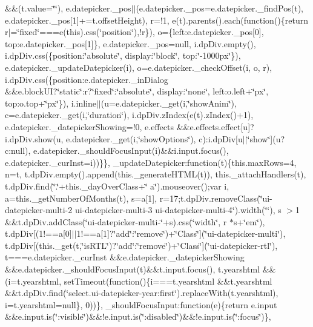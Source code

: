 {{\begin{DoxyParamCaption}
\&\&(t.\+value=\char`\"{}\char`\"{}), e.\+datepicker.\+\_\+pos$\vert$$\vert$(e.\+datepicker.\+\_\+pos=e.\+datepicker.\+\_\+find\+Pos(t), e.\+datepicker.\+\_\+pos\mbox{[}1\mbox{]}+=t.\+offset\+Height), r=!1, e(t).\+parents().\+each(function()\{return r$\vert$=\char`\"{}fixed\char`\"{}===e(this).\+css(\char`\"{}position\char`\"{}),!r\}), o=\{left\+:e.\+datepicker.\+\_\+pos\mbox{[}0\mbox{]}, top\+:e.\+datepicker.\+\_\+pos\mbox{[}1\mbox{]}\}, e.\+datepicker.\+\_\+pos=null, i.\+dp\+Div.\+empty(), i.\+dp\+Div.\+css(\{position\+:\char`\"{}absolute\char`\"{}, display\+:\char`\"{}block\char`\"{}, top\+:\char`\"{}-\/1000px\char`\"{}\}), e.\+datepicker.\+\_\+update\+Datepicker(i), o=e.\+datepicker.\+\_\+check\+Offset(i, o, r), i.\+dp\+Div.\+css(\{position\+:e.\+datepicker.\+\_\+in\+Dialog \&\&e.\+block\+U\+I?\char`\"{}static\char`\"{}\+:r?\char`\"{}fixed\char`\"{}\+:\char`\"{}absolute\char`\"{}, display\+:\char`\"{}none\char`\"{}, left\+:o.\+left+\char`\"{}px\char`\"{}, top\+:o.\+top+\char`\"{}px\char`\"{}\}), i.\+inline$\vert$$\vert$(u=e.\+datepicker.\+\_\+get(i,\char`\"{}show\+Anim\char`\"{}), c=e.\+datepicker.\+\_\+get(i,\char`\"{}duration\char`\"{}), i.\+dp\+Div.\+z\+Index(e(t).\+z\+Index()+1), e.\+datepicker.\+\_\+datepicker\+Showing=!0, e.\+effects \&\&e.\+effects.\+effect\mbox{[}u\mbox{]}?i.\+dp\+Div.\+show(u, e.\+datepicker.\+\_\+get(i,\char`\"{}show\+Options\char`\"{}), c)\+:i.\+dp\+Div\mbox{[}u$\vert$$\vert$\char`\"{}show\char`\"{}\mbox{]}(u?c\+:null), e.\+datepicker.\+\_\+should\+Focus\+Input(i)\&\&i.\+input.\+focus(), e.\+datepicker.\+\_\+cur\+Inst=i))\}\}, \+\_\+update\+Datepicker\+:function(t)\{this.\+max\+Rows=4, n=t, t.\+dp\+Div.\+empty().\+append(this.\+\_\+generate\+H\+T\+M\+L(t)), this.\+\_\+attach\+Handlers(t), t.\+dp\+Div.\+find(\char`\"{}.\char`\"{}+this.\+\_\+day\+Over\+Class+\char`\"{} a\char`\"{}).\+mouseover();var i, a=this.\+\_\+get\+Number\+Of\+Months(t), s=a\mbox{[}1\mbox{]}, r=17;t.\+dp\+Div.\+remove\+Class(\char`\"{}ui-\/datepicker-\/multi-\/2 ui-\/datepicker-\/multi-\/3 ui-\/datepicker-\/multi-\/4\char`\"{}).\+width(\char`\"{}\char`\"{}), s $>$1 \&\&t.\+dp\+Div.\+add\+Class(\char`\"{}ui-\/datepicker-\/multi-\/\char`\"{}+s).\+css(\char`\"{}width\char`\"{}, r $\ast$s+\char`\"{}em\char`\"{}), t.\+dp\+Div\mbox{[}(1!==a\mbox{[}0\mbox{]}$\vert$$\vert$1!==a\mbox{[}1\mbox{]}?\char`\"{}add\char`\"{}\+:\char`\"{}remove\char`\"{})+\char`\"{}\+Class\char`\"{}\mbox{]}(\char`\"{}ui-\/datepicker-\/multi\char`\"{}), t.\+dp\+Div\mbox{[}(this.\+\_\+get(t,\char`\"{}is\+R\+T\+L\char`\"{})?\char`\"{}add\char`\"{}\+:\char`\"{}remove\char`\"{})+\char`\"{}\+Class\char`\"{}\mbox{]}(\char`\"{}ui-\/datepicker-\/rtl\char`\"{}), t===e.\+datepicker.\+\_\+cur\+Inst \&\&e.\+datepicker.\+\_\+datepicker\+Showing \&\&e.\+datepicker.\+\_\+should\+Focus\+Input(t)\&\&t.\+input.\+focus(), t.\+yearshtml \&\&(i=t.\+yearshtml, set\+Timeout(function()\{i===t.\+yearshtml \&\&t.\+yearshtml \&\&t.\+dp\+Div.\+find(\char`\"{}select.\+ui-\/datepicker-\/year\+:first\char`\"{}).\+replace\+With(t.\+yearshtml), i=t.\+yearshtml=null\}, 0))\}, \+\_\+should\+Focus\+Input\+:function(e)\{return e.\+input \&\&e.\+input.\+is(\char`\"{}\+:visible\char`\"{})\&\&!e.\+input.\+is(\char`\"{}\+:disabled\char`\"{})\&\&!e.\+input.\+is(\char`\"{}\+:focus\char`\"{})\}, 
\end{DoxyParamCaption}}}
